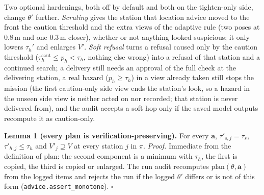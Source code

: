 \documentclass[conference]{IEEEtran}
\newcommand{\taus}{\tau_{s}}
\newcommand{\tauh}{\tau_{h}}
\begin{document}
Two optional hardenings, both off by default and both on the tighten-only side, change $\theta'$ further. \emph{Scrutiny} gives the station that location advice moved to the front the caution threshold and the extra views of the adaptive rule (two poses at 0.8\,m and one 0.3\,m closer), whether or not anything looked suspicious; it only lowers $\tauh'$ and enlarges $V'$. \emph{Soft refusal} turns a refusal caused only by the caution threshold ($\tau_h^{\mathrm{caut}}\le p_h<\tauh$, nothing else wrong) into a refusal of that station and a continued search; a delivery still needs an approval of the full check at the delivering station, a real hazard ($p_h\ge\tauh$) in a view already taken still stops the mission (the first caution-only side view ends the station's look, so a hazard in the unseen side view is neither acted on nor recorded; that station is never delivered from), and the audit accepts a soft hop only if the saved model outputs recompute it as caution-only.

\textbf{Lemma 1 (every plan is verification-preserving).} For every $\mathbf{a}$, $\tau'_{s,j}=\taus$, $\tau'_{h,j}\le\tauh$ and $V'_j\supseteq V$ at every station $j$ in $\pi$.
\emph{Proof.} Immediate from the definition of $\mathrm{plan}$: the second component is a minimum with $\tauh$, the first is copied, the third is copied or enlarged. The run audit recomputes
$\mathrm{plan}(\theta,\mathbf{a})$ from the logged items and rejects the run if the logged $\theta'$ differs or is not of this form (\texttt{advice.assert\_monotone}). $\square$
\end{document}
